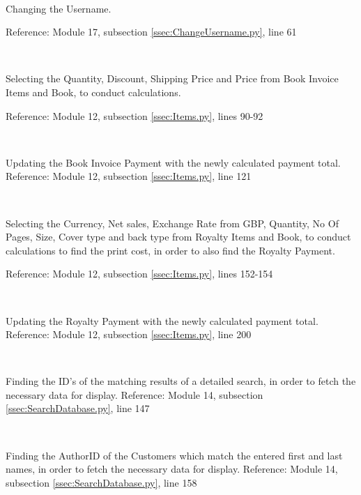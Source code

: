 \

Changing the Username.
\begin{small}
\end{small}
Reference: Module 17,  subsection \ref{ssec:ChangeUsername.py}, line 61

\

Selecting the Quantity, Discount, Shipping Price and Price from Book Invoice Items and Book, to conduct calculations.
\begin{tiny}
\end{tiny}
Reference: Module 12,  subsection \ref{ssec:Items.py}, lines 90-92

\

Updating the Book Invoice Payment with the newly calculated payment total.
Reference: Module 12,  subsection \ref{ssec:Items.py}, line 121

\

Selecting the Currency, Net sales, Exchange Rate from GBP, Quantity, No Of Pages, Size, Cover type and back type from Royalty Items and Book, to conduct calculations to find the print cost, in order to also find the Royalty Payment.
\begin{tiny}
\end{tiny}
Reference: Module 12,  subsection \ref{ssec:Items.py}, lines 152-154

\

Updating the Royalty Payment with the newly calculated payment total.
Reference: Module 12,  subsection \ref{ssec:Items.py}, line 200

\

Finding the ID's of the matching results of a detailed search, in order to fetch the necessary data for display.
Reference: Module 14,  subsection \ref{ssec:SearchDatabase.py}, line 147

\

Finding the AuthorID of the Customers which match the entered first and last names, in order to fetch the necessary data for display.
Reference: Module 14,  subsection \ref{ssec:SearchDatabase.py}, line 158

